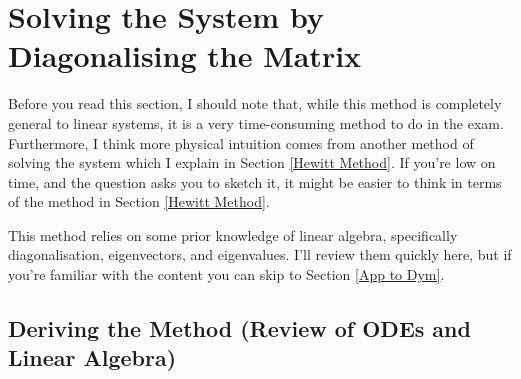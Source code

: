 \section{Solving the System by Diagonalising the Matrix}

Before you read this section, I should note that, while this method is completely general to linear systems, it is a very time-consuming method to do in the exam. Furthermore, I think more physical intuition comes from another method of solving the system which I explain in Section \ref{Hewitt Method}. If you're low on time, and the question asks you to sketch it, it might be easier to think in terms of the method in Section \ref{Hewitt Method}.

This method relies on some prior knowledge of linear algebra, specifically diagonalisation, eigenvectors, and eigenvalues. I'll review them quickly here, but if you're familiar with the content you can skip to Section \ref{App to Dym}. 

\subsection{Deriving the Method (Review of ODEs and Linear Algebra)}
